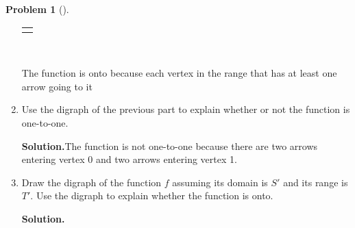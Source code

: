 \documentclass[10pt,]{book}
\theoremstyle{plain}
\theoremstyle{definition}
\newtheorem{activity}[project]{Problem}
\theoremstyle{definition}
\numberwithin{equation}{chapter}
\newlength{\panelmax}
\begin{document}
\begin{activity}[]
\begin{enumerate}[font=\bfseries,label=(\alph*),ref=\alph*]
{{{{
}
}}
\newlength{\phAWimage}\setlength{\phAWimage}{\ht\panelboxAWimage+\dp\panelboxAWimage}
\settototalheight{\phAWimage}{\usebox{\panelboxAWimage}}
\setlength{\panelmax}{\maxof{\panelmax}{\phAWimage}}
\leavevmode%
\setlength{\tabcolsep}{0\linewidth}
\par\medskip\noindent
\hspace*{0.25\linewidth}%
\begin{tabular}{@{}*{1}{c}@{}}
\begin{minipage}[c][\panelmax][t]{0.5\linewidth}\usebox{\panelboxAWimage}\end{minipage}\end{tabular}\\
}%
\par
The function is onto because each vertex in the range that has at least one arrow going to it%
\item\label{task-245} Use the digraph of the previous part to explain whether or not the function is one-to-one.%
\par\medskip\noindent%
\textbf{Solution.}\quad The function is not one-to-one because there are two arrows entering vertex 0 and two arrows entering vertex 1.%
\item\label{task-246} Draw the digraph of the function \(f\) assuming its domain is \(S'\) and its range is \(T'\). Use the digraph to explain whether the function is onto.%
\par\medskip\noindent%
\textbf{Solution.}\quad %
{%
\setlength{\panelmax}{0pt}
\newsavebox{\panelboxAXimage}
}
\end{enumerate}
\end{activity}
\end{document}
